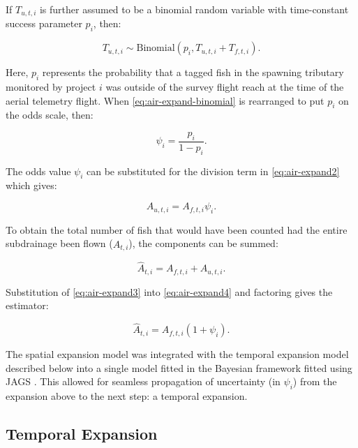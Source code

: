 \documentclass[12pt,]{book}
\theoremstyle{definition}
\theoremstyle{definition}
\theoremstyle{definition}
\theoremstyle{remark}
\begin{document}
\noindent
If \(T_{u,t,i}\) is further assumed to be a binomial random variable
with time-constant success parameter \(p_i\), then:

\begin{equation}
  T_{u,t,i} \sim \text{Binomial}(p_i,T_{u,t,i} + T_{f,t,i}).
  \label{eq:air-expand-binomial}
\end{equation}

\noindent
Here, \(p_i\) represents the probability that a tagged fish in the
spawning tributary monitored by project \(i\) was outside of the survey
flight reach at the time of the aerial telemetry flight. When
\eqref{eq:air-expand-binomial} is rearranged to put \(p_i\) on the odds
scale, then:

\begin{equation}
  \psi_i=\frac{p_i}{1-p_i}.
  \label{eq:air-expand-odds}
\end{equation}

\noindent
The odds value \(\psi_i\) can be substituted for the division term in
\eqref{eq:air-expand2} which gives:

\begin{equation}
  A_{u,t,i} = A_{f,t,i} \psi_i.
  \label{eq:air-expand3}
\end{equation}

\noindent
To obtain the total number of fish that would have been counted had the
entire subdrainage been flown (\(\hat{A}_{t,i}\)), the components can be
summed:

\begin{equation}
  \hat{A}_{t,i} = A_{f,t,i} + A_{u,t,i}.
  \label{eq:air-expand4}
\end{equation}

\noindent
Substitution of \eqref{eq:air-expand3} into \eqref{eq:air-expand4} and
factoring gives the estimator:

\begin{equation}
  \hat{A}_{t,i}=A_{f,t,i}(1 + \psi_i).
  \label{eq:air-expand-final}
\end{equation}

\noindent
The spatial expansion model was integrated with the temporal expansion
model described below into a single model fitted in the Bayesian
framework fitted using JAGS \citep{plummer-2017}. This allowed for
seamless propagation of uncertainty (in \(\psi_i\)) from the expansion
above to the next step: a temporal expansion.

\subsection{Temporal Expansion}\label{temp-expansion}
\end{document}
